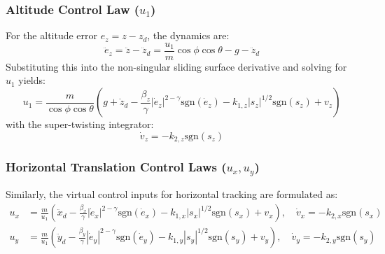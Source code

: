 \subsubsection{Altitude Control Law ($u_1$)}
For the altitude error $e_z = z - z_d$, the dynamics are:
\begin{equation}
\ddot{e}_z = \ddot{z} - \ddot{z}_d = \frac{u_1}{m}\cos\phi\cos\theta - g - \ddot{z}_d
\end{equation}
Substituting this into the non-singular sliding surface derivative and solving for $u_1$ yields:
\begin{equation}
u_1 = \frac{m}{\cos\phi \cos\theta} \left( g + \ddot{z}_d - \frac{\beta_z}{\gamma} |\dot{e}_z|^{2 - \gamma} \text{sgn}(\dot{e}_z) - k_{1,z} |s_z|^{1/2} \text{sgn}(s_z) + v_z \right)
\end{equation}
with the super-twisting integrator:
\begin{equation}
\dot{v}_z = -k_{2,z} \text{sgn}(s_z)
\end{equation}

\subsubsection{Horizontal Translation Control Laws ($u_x, u_y$)}
Similarly, the virtual control inputs for horizontal tracking are formulated as:
\begin{align}
u_x &= \frac{m}{u_1} \left( \ddot{x}_d - \frac{\beta_x}{\gamma} |\dot{e}_x|^{2 - \gamma} \text{sgn}(\dot{e}_x) - k_{1,x} |s_x|^{1/2} \text{sgn}(s_x) + v_x \right), \quad \dot{v}_x = -k_{2,x} \text{sgn}(s_x) \\
u_y &= \frac{m}{u_1} \left( \ddot{y}_d - \frac{\beta_y}{\gamma} |\dot{e}_y|^{2 - \gamma} \text{sgn}(\dot{e}_y) - k_{1,y} |s_y|^{1/2} \text{sgn}(s_y) + v_y \right), \quad \dot{v}_y = -k_{2,y} \text{sgn}(s_y)
\end{align}

